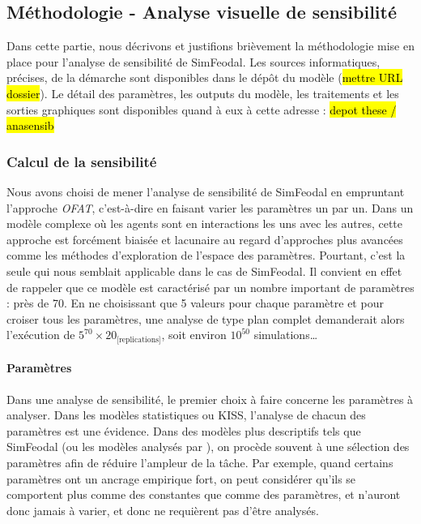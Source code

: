 \subsection{Méthodologie - Analyse visuelle de sensibilité}

Dans cette partie, nous décrivons et justifions brièvement la méthodologie mise en place pour l'analyse de sensibilité de SimFeodal.
Les sources informatiques, précises, de la démarche sont disponibles dans le dépôt du modèle (\hl{mettre URL dossier}).
Le détail des paramètres, les outputs du modèle, les traitements et les sorties graphiques sont disponibles quand à eux à cette adresse : \hl{depot these / anasensib}

%


\subsubsection{Calcul de la sensibilité}

Nous avons choisi de mener l'analyse de sensibilité de SimFeodal en empruntant l'approche \textit{OFAT}, c'est-à-dire en faisant varier les paramètres un par un.
Dans un modèle complexe où les agents sont en interactions les uns avec les autres, cette approche est forcément biaisée et lacunaire au regard d'approches plus avancées comme les méthodes d'exploration de l'espace des paramètres.
Pourtant, c'est la seule qui nous semblait applicable dans le cas de SimFeodal.
Il convient en effet de rappeler que ce modèle est caractérisé par un nombre important de paramètres : près de 70.
En ne choisissant que 5 valeurs pour chaque paramètre et pour croiser tous les paramètres, une analyse de type plan complet demanderait alors l'exécution de $5^{70} \times 20_{\text{[replications]}}$, soit environ $10^{50}$ simulations\ldots

\paragraph{Paramètres}

Dans une analyse de sensibilité, le premier choix à faire concerne les paramètres à analyser.
Dans les modèles statistiques ou KISS, l'analyse de chacun des paramètres est une évidence.
Dans des modèles plus descriptifs tels que SimFeodal (ou les modèles analysés par \textcite{hirtzel2015exploration}), on procède souvent à une sélection des paramètres afin de réduire l'ampleur de la tâche.
Par exemple, quand certains paramètres ont un ancrage empirique fort, on peut considérer qu'ils se comportent plus comme des constantes que comme des paramètres, et n'auront donc jamais à varier, et donc ne requièrent pas d'être analysés.

